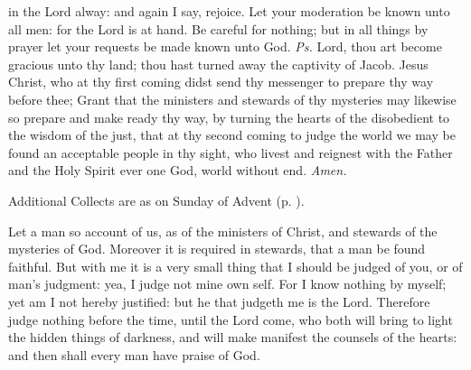 
\introit
{} in the Lord alway: and again I say, rejoice. Let your moderation be known unto all men: for the Lord is at hand. Be careful for nothing; but in all things by prayer let your requests be made known unto God. \textit{Ps.} Lord, thou art become gracious unto thy land; thou hast turned away the captivity of Jacob.
\collect
{} Jesus Christ, who at thy first coming didst send thy messenger to prepare thy way before thee; Grant that the ministers and stewards of thy mysteries may likewise so prepare and make ready thy way, by turning the hearts of the disobedient to the wisdom of the just, that at thy second coming to judge the world we may be found an acceptable people in thy sight, who livest and reignest with the Father and the Holy Spirit ever one God, world without end. \textit{Amen.}
\begin{rubric}
    Additional Collects are as on  Sunday of Advent (p. \pageref{AdventI}).
\end{rubric}
 Let a man so account of us, as of the ministers of Christ, and stewards of the mysteries of God. Moreover it is required in stewards, that a man be found faithful. But with me it is a very small thing that I should be judged of you, or of man's judgment: yea, I judge not mine own self. For I know nothing by myself; yet am I not hereby justified: but he that judgeth me is the Lord. Therefore judge nothing before the time, until the Lord come, who both will bring to light the hidden things of darkness, and will make manifest the counsels of the hearts: and then shall every man have praise of God.


